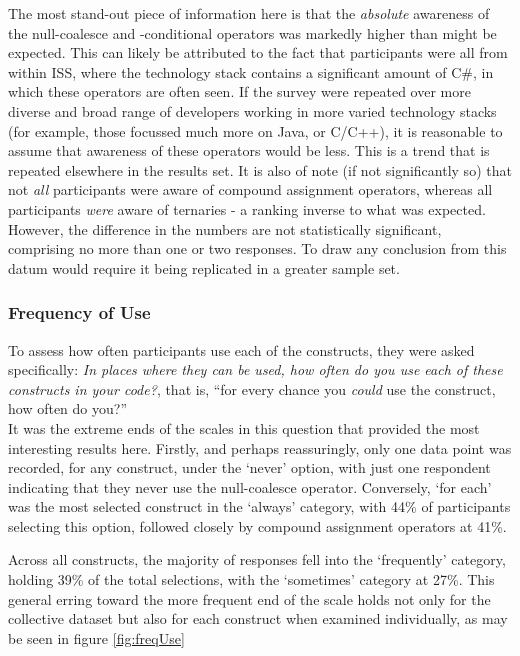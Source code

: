 \documentclass{article}
\begin{document}
            The most stand-out piece of information here is that the \emph{absolute} awareness of the null-coalesce and -conditional operators was markedly higher than might be expected. This can likely be attributed to the fact that participants were all from within ISS, where the  technology stack contains a significant amount of C\#, in which these operators are often seen. If the survey were repeated over more diverse and broad range of developers working in more varied technology stacks (for example, those focussed much more on Java, or C/C++), it is reasonable to assume that awareness of these operators would be less. This is a trend that is repeated elsewhere in the results set.
            It is also of note (if not significantly so) that not \emph{all} participants were aware of compound assignment operators, whereas all participants \emph{were} aware of ternaries - a ranking inverse to what was expected. However, the difference in the numbers are not statistically significant, comprising no more than one or two responses. To draw any conclusion from this datum would require it being replicated in a greater sample set.
        \subsubsection{Frequency of Use}
            To assess how often participants use each of the constructs, they were asked specifically: \textit{In places where they can be used, how often do you use each of these constructs in your code?}, that is, ``for every chance you \emph{could} use the construct, how often do you?''
            \\\newline
            It was the extreme ends of the scales in this question that provided the most interesting results here. Firstly, and perhaps reassuringly, only one data point was recorded, for any construct, under the `never' option, with just one respondent indicating that they never use the null-coalesce operator. Conversely, `for each' was the most selected construct in the `always' category, with 44\% of participants selecting this option, followed closely by compound assignment operators at 41\%.

            Across all constructs, the majority of responses fell into the `frequently' category, holding 39\% of the total selections, with the `sometimes' category at 27\%. This general erring toward the more frequent end of the scale holds not only for the collective dataset but also for each construct when examined individually, as may be seen in figure \ref{fig:freqUse}
\end{document}
